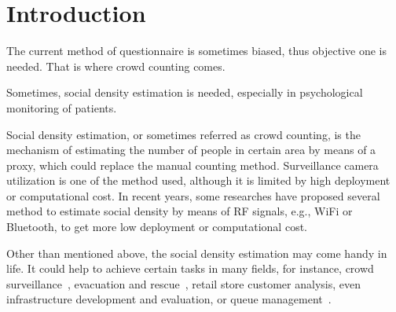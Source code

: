 \chapter{Introduction}\label{ch:introduction}



The current method of questionnaire is sometimes biased, thus objective one is needed. That is where crowd counting comes.

Sometimes, social density estimation is needed, especially in psychological monitoring of patients.

Social density estimation, or sometimes referred as crowd counting, is the mechanism of estimating the number of people in certain area by means of a proxy, which could replace the manual counting method. Surveillance camera utilization is one of the method used, although it is limited by high deployment or computational cost. In recent years, some researches have proposed several method to estimate social density by means of RF signals, e.g., WiFi or Bluetooth, to get more low deployment or computational cost.

Other than mentioned above, the social density estimation may come handy in life. It could help to achieve certain tasks in many fields, for instance, crowd surveillance~\cite{thesis050}, evacuation and rescue~\cite{thesis045}, retail store customer analysis, even infrastructure development and evaluation, or queue management~\cite{thesis012}.





